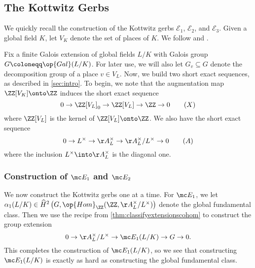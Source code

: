 \subsection{The Kottwitz Gerbs} \label{sec:globalsetup}
We quickly recall the construction of the Kottwitz gerbs $\mathcal E_1$, $\mathcal E_2$, and $\mathcal E_3$. Given a global field $K$, let $V_K$ denote the set of places of $K$. We follow \cite{kottwitz} and \cite{tate-torus}.

Fix a finite Galois extension of global fields $L/K$ with Galois group $G\coloneqq\op{Gal}(L/K)$. For later use, we will also let $G_v\subseteq G$ denote the decomposition group of a place $v\in V_L$. Now, we build two short exact sequences, as described in \autoref{sec:intro}. To begin, we note that the augmentation map $\ZZ[V_K]\onto\ZZ$ induces the short exact sequence
\[0\to\ZZ[V_L]_0\to\ZZ[V_L]\to\ZZ\to0\label{eq:sesx}\tag{$X$}\]
where $\ZZ[V_L]$ is the kernel of $\ZZ[V_L]\onto\ZZ$. We also have the short exact sequence
\[0\to L^\times\to\AA_L^\times\to\AA_L^\times/L^\times\to0\tag{$A$}\label{eq:sesa}\]
where the inclusion $L^\times\into\AA_L^\times$ is the diagonal one.

\subsubsection{Construction of \texorpdfstring{$\mc E_1$ and $\mc E_2$}{ E1 and E2}}
We now construct the Kottwitz gerbs one at a time. For $\mc E_1$, we let $\alpha_1(L/K)\in\widehat H^2\left(G,\op{Hom}_\ZZ(\ZZ,\AA_L^\times/L^\times)\right)$ denote the global fundamental class. Then we use the recipe from \autoref{thm:classifyextensionscohom} to construct the group extension
\[0\to\AA_L^\times/L^\times\to\mc E_1(L/K)\to G\to0.\]
This completes the construction of $\mc E_1(L/K)$, so we see that constructing $\mc E_1(L/K)$ is exactly as hard as constructing the global fundamental class.

